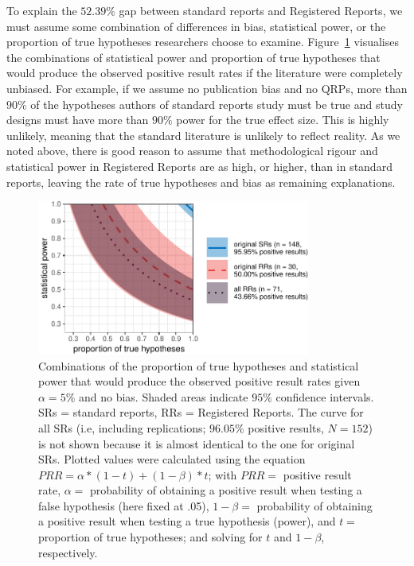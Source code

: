 \documentclass[british,,man,floatsintext]{apa6}
\begin{document}
To explain the \(52.39 \%\) gap between standard reports and Registered Reports, we must assume some combination of differences in bias, statistical power, or the proportion of true hypotheses researchers choose to examine.
Figure~\ref{fig:powerbaserate} visualises the combinations of statistical power and proportion of true hypotheses that would produce the observed positive result rates if the literature were completely unbiased.
For example, if we assume no publication bias and no QRPs, more than \(90\%\) of the hypotheses authors of standard reports study must be true and study designs must have more than \(90\%\) power for the true effect size.
This is highly unlikely, meaning that the standard literature is unlikely to reflect reality.
As we noted above, there is good reason to assume that methodological rigour and statistical power in Registered Reports are as high, or higher, than in standard reports, leaving the rate of true hypotheses and bias as remaining explanations.



\begin{figure}

{\centering \includegraphics[width=0.8\textwidth]{manuscript_files/figure-latex/powerbaserate-1} 

}

\caption{Combinations of the proportion of true hypotheses and statistical power that would produce the observed positive result rates given \(\alpha = 5 \%\) and no bias. Shaded areas indicate \(95\%\) confidence intervals. SRs = standard reports, RRs = Registered Reports. The curve for all SRs (i.e, including replications; \(96.05 \%\) positive results, \(N = 152\)) is not shown because it is almost identical to the one for original SRs. Plotted values were calculated using the equation \(PRR = \alpha*(1-t) + (1-\beta)*t\); with \(PRR =\) positive result rate, \(\alpha =\) probability of obtaining a positive result when testing a false hypothesis (here fixed at .05), \(1-\beta =\) probability of obtaining a positive result when testing a true hypothesis (power), and \(t =\) proportion of true hypotheses; and solving for \(t\) and \(1-\beta\), respectively.}\label{fig:powerbaserate}
\end{figure}
\end{document}
